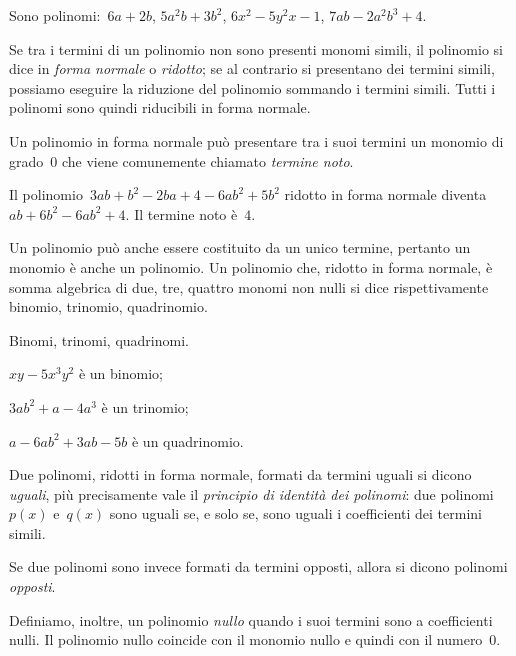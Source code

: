 \begin{esempio}
Sono polinomi:~\(6a+2b\), \(5a^2b+3b^2\), \(6x^2-5y^2x-1\), \(7ab-2a^2b^3+4\).
\end{esempio}

Se tra i termini di un polinomio non sono presenti monomi simili, il 
polinomio si dice in \emph{forma normale} o
\emph{ridotto}; se al contrario si presentano dei termini simili, possiamo 
eseguire la riduzione del polinomio
sommando i termini simili. Tutti i polinomi sono quindi riducibili in forma 
normale.

Un polinomio in forma normale può presentare tra i suoi termini un monomio 
di grado~0 che viene
comunemente chiamato \emph{termine noto}.

\begin{esempio}
Il polinomio~\(3ab+b^2-2ba+4-6ab^2+5b^2\) ridotto in forma normale 
diventa~\(ab+6b^2-6ab^2+4\). Il termine noto è~\(4\).
\end{esempio}


Un polinomio può anche essere costituito da un unico termine, pertanto un 
monomio è anche un polinomio.
Un polinomio che, ridotto in forma normale, è somma algebrica di due, tre, 
quattro monomi non nulli si dice
rispettivamente binomio, trinomio, quadrinomio.

\begin{esempio}
Binomi, trinomi, quadrinomi.
\begin{enumeratea}
\item \(xy-5x^3y^2\) è un binomio;
\item \(3ab^2 +a-4a^3\) è un trinomio;
\item \(a-6ab^2+3ab-5b\) è un quadrinomio.
\end{enumeratea}
\end{esempio}

\begin{definizione}
Due polinomi, ridotti in forma normale, formati da termini uguali si dicono 
\emph{uguali}, più precisamente vale il \emph{principio di identità dei 
polinomi}:
due polinomi~\(p(x)\) e~\(q(x)\) sono uguali se, e solo se, sono uguali
i coefficienti dei termini simili.

Se due polinomi sono invece formati da termini opposti, allora si dicono 
polinomi \emph{opposti}.

Definiamo, inoltre, un polinomio \emph{nullo} quando i suoi termini sono a 
coefficienti nulli. Il polinomio nullo
coincide con il monomio nullo e quindi con il numero~0.
\end{definizione}

